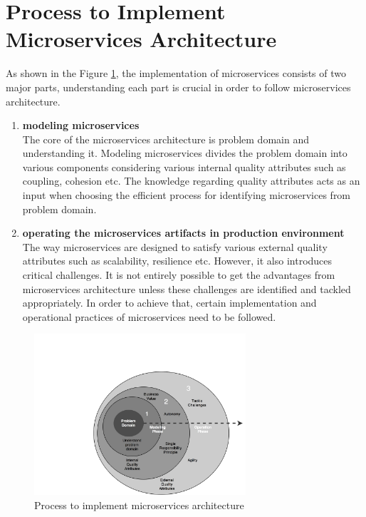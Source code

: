 \section{Process to Implement Microservices Architecture}\label{section:guidelines/process_to_microservices}
As shown in the Figure \ref{fig:guidelines/chapter_nine_process}, the implementation of microservices consists of two major parts, understanding each part is crucial in order to follow microservices architecture.
\begin{enumerate}
\item \textbf{modeling microservices} \\
The core of the microservices architecture is problem domain and understanding it. Modeling microservices divides the problem domain into various components considering various internal quality attributes such as coupling, cohesion etc. The knowledge regarding quality attributes acts as an input when choosing the efficient process for identifying microservices from problem domain.
\item \textbf{operating the microservices artifacts in production environment} \\
The way microservices are designed to satisfy various external quality attributes such as scalability, resilience etc. However, it also introduces critical challenges. It is not entirely possible to get the advantages from microservices architecture unless these challenges are identified and tackled appropriately. In order to achieve that, certain implementation and operational practices of microservices need to be followed.
\end{enumerate}
\begin{figure}[H]
\begin{center}
\includegraphics[width=0.7\textwidth]{figures/chapter_nine_process}
\caption{Process to implement microservices architecture}
\label{fig:guidelines/chapter_nine_process}
\end{center}
\end{figure}
